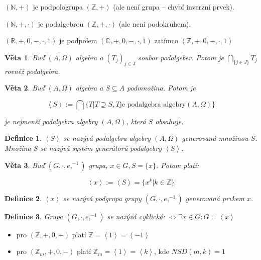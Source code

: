 \documentclass[a4paper, 11pt]{report}
\newtheorem{mydef}{Definice}[chapter]
\newtheorem{veta}{Věta}[chapter]
\begin{document}
$(\mathbb{N}, +)$ je podpologrupa $(\mathbb{Z}, +)$ (ale není grupa -- chybí inverzní prvek).

$(\mathbb{N}, +, \cdot)$ je podalgebrou $(\mathbb{Z}, +, \cdot)$ (ale není podokruhem).

$(\mathbb{R}, +, 0, -, \cdot, 1)$ je podpolem $(\mathbb{C}, +, 0, -,\cdot, 1)$ zatímco $(\mathbb{Z}, +, 0, -,\cdot, 1)$

\begin{veta}
Buď $(A, \Omega)$ algebra a $(T_j)_{j \in J}$ soubor podalgeber. Potom je $\bigcap_{\{j \in J\}} T_j$ rovněž podalgebra.
\end{veta}

\begin{veta}
Buď $(A, \Omega)$ algebra a $S \subseteq A$ podmnožina. Potom je

$$\left< S \right> := \bigcap\{T | T \supseteq S, T \text{je podalgebra algebry} (A, \Omega)\}$$

je nejmenší podalgebra algebry $(A, \Omega)$, která $S$ obsahuje.
\end{veta}

\begin{mydef}
$\left< S \right>$ se nazývá podalgebra algebry $(A, \Omega)$ generovaná množinou $S$. Množina $S$ se nazývá systém generátorů podalgebry $\left< S \right>$.
\end{mydef}

\begin{veta}
Buď $(G, \cdot, e, ^{-1})$ grupa, $x \in G, S = \{x\}$. Potom platí:

$$\left< x \right> := \left< S \right> = \{x^k | k \in \mathbb{Z}\}$$
\end{veta}

\begin{mydef}
$\left< x \right>$ se nazývá podgrupa grupy $(G, \cdot, e, ^{-1})$ generovaná prvkem $x$.
\end{mydef}

\begin{mydef}
Grupa $(G, \cdot, e, ^{-1})$ se nazývá cyklická: $\Leftrightarrow \exists x \in G: G = \left< x \right>$
\end{mydef}

\begin{itemize}
	\item pro $(\mathbb{Z}, +, 0, -)$ platí $\mathbb{Z} = \left< 1 \right> = \left< -1 \right>$
	\item pro $(\mathbb{Z}_m, +, 0, -)$ platí $\mathbb{Z}_m = \left< 1 \right> = \left< k \right>$, kde $NSD(m, k) = 1$
\end{itemize}
\end{document}
